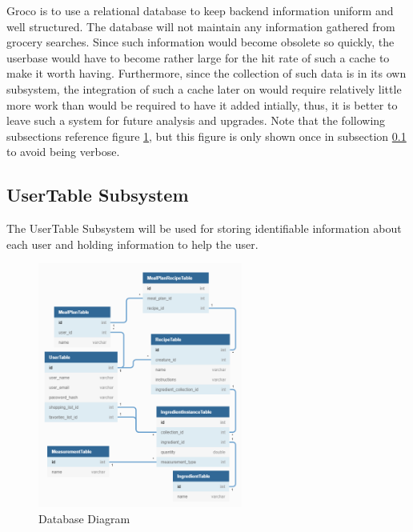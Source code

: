 Groco is to use a relational database to keep backend information uniform and well structured.  The database will not maintain any information gathered from grocery searches.  Since such information would become obsolete so quickly, the userbase would have to become rather large for the hit rate of such a cache to make it worth having.  Furthermore, since the collection of such data is in its own subsystem, the integration of such a cache later on would require relatively little more work than would be required to have it added intially, thus, it is better to leave such a system for future analysis and upgrades.  Note that the following subsections reference figure \ref{fig:db.1}, but this figure is only shown once in subsection \ref{section:db.1} to avoid being verbose.


\subsection{UserTable Subsystem}\label{section:db.1}
The UserTable Subsystem will be used for storing identifiable information about each user and holding information to help the user.

\begin{figure}[h!]\label{fig:db.1}
	\centering
 	\includegraphics[width=0.60\textwidth]{images/Database}
 \caption{Database Diagram}
\end{figure}

